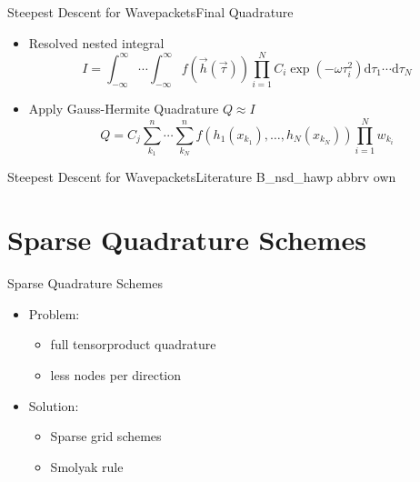 \documentclass{beamer}
\begin{document}
\begin{frame}{Steepest Descent for Wavepackets}{Final Quadrature}
  \begin{itemize}
    \item Resolved nested integral
    \begin{equation*}
      I = \int_{-\infty}^\infty \cdots \int_{-\infty}^\infty
          f\left(\vec{h}(\vec{\tau})\right)
          \prod_{i=1}^N C_i
                        \exp\left(-\omega \tau_i^2\right)
          \mathrm{d}\tau_1 \cdots \mathrm{d}\tau_N
    \end{equation*}
    \item Apply Gauss-Hermite Quadrature $Q \approx I$
    \begin{equation*}
      Q =
      C_j
      \sum_{k_1}^n \cdots \sum_{k_N}^n
      f\left(h_1\left(x_{k_1}\right),
           \ldots,
           h_N\left(x_{k_N}\right)
    \right)
    \prod_{i=1}^N w_{k_i}
    \end{equation*}
  \end{itemize}
\end{frame}


\begin{frame}{Steepest Descent for Wavepackets}{Literature}
  \nocite{sdwp}{B_nsd_hawp}
  \scriptsize
  {abbrv}
  {own}{}
\end{frame}


\section{Sparse Quadrature Schemes}


\begin{frame}{Sparse Quadrature Schemes}
  \begin{itemize}
  \item Problem:
    \begin{itemize}
    \item full tensorproduct quadrature
    \item less nodes per direction
    \end{itemize}
  \end{itemize}
  \vspace{0.5cm}
  \begin{itemize}
  \item Solution:
    \begin{itemize}
    \item Sparse grid schemes
    \item Smolyak rule
    \end{itemize}
  \end{itemize}
\end{frame}
\end{document}
